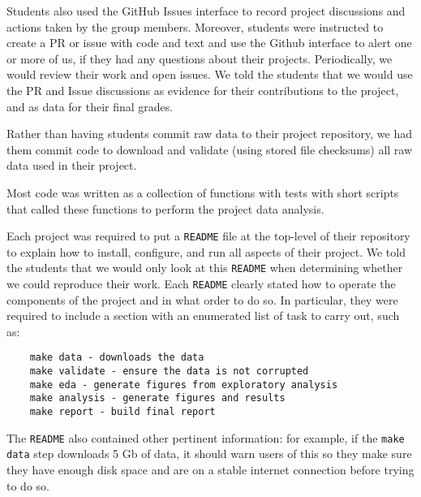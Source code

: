 Students also used the GitHub Issues interface to record project discussions
and actions taken by the group members.
Moreover, students were instructed to create a PR
or issue with code and text and use the Github interface to alert one or more
of us, if they had any questions about their projects.
Periodically, we would review their work and open issues.
We told the students that we would use the PR and Issue discussions
as evidence for their contributions to the project, and as data for their
final grades.

Rather than having students commit raw data to their project repository, we had
them commit code to download and validate (using stored file checksums)
all raw data used in their project.

Most code was written as a collection of functions with tests with short
scripts that called these functions to perform the project data analysis.


Each project was required to put a \texttt{README} file at the top-level
of their repository to explain how to install, configure,
and run all aspects of their project.
We told the students that we would only look at this \texttt{README}
when determining whether we could reproduce their work.
Each \texttt{README} clearly stated  how to operate the
components of the project and in what order to do so.
In particular, they were required to include a section with
an enumerated list of task to carry out, such as:
\begin{verbatim}
    make data - downloads the data 
    make validate - ensure the data is not corrupted
    make eda - generate figures from exploratory analysis
    make analysis - generate figures and results
    make report - build final report
\end{verbatim}

The \texttt{README} also contained other pertinent information:
for example, if the \texttt{make data} step downloads 5 Gb of data, it should
warn users of this so they make sure they have enough disk space and are on a
stable internet connection before trying to do so.

